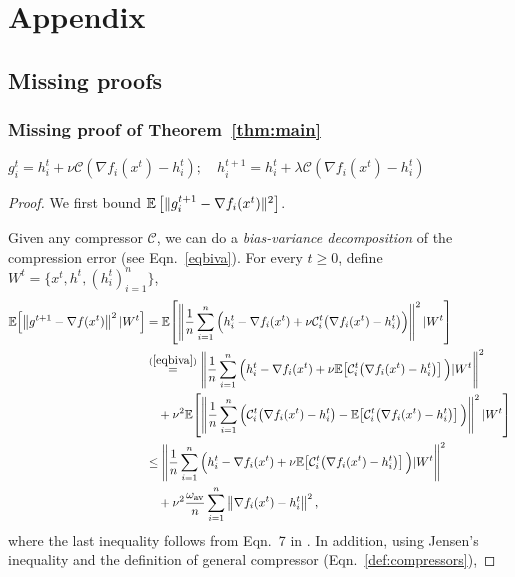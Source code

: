 \documentclass{article} %
\theoremstyle{plain}
\theoremstyle{definition}
\theoremstyle{remark}
\newcommand{\C}{\mathcal{C}}
\newcommand{\sqnorm}[1]{\left\| #1 \right\|^2}
\newcommand{\Exp}[1]{\mathbb{E}\!\left[ #1 \right]}
\newcommand{\oma}{\omega_{\mathrm{av}}}
\begin{document}
\section{Appendix}
\subsection{Missing proofs}
\subsubsection{Missing proof of Theorem~\ref{thm:main}}
$g_i^t = h_i^t + \nu \C(\nabla f_i (x^t) - h_i^t); \quad h_i^{t+1} = h_i^t + \lambda \C(\nabla f_i (x^t) - h_i^t)$

\begin{proof}
   We first bound $\mathbb{E}\left[\|g_i^{t+1} - \nabla f_i(x^{t})\|^2\right]$. 

   Given any compressor $\mathcal{C}$, we can do a {\it bias-variance decomposition} of the compression error (see Eqn.~\ref{eqbiva}). 
   For every $t\geq 0$, define $W^t = \{x^t, h^t, (h_i^t)_{i=1}^n\}$,
   \begin{equation}\label{eq0001}
   \begin{aligned}
      \Exp{\sqnorm{g^{t+1}-\nabla f(x^t)} | W^t} &=\Exp{\sqnorm{\frac{1}{n}\sum_{i=1}^n \Big(h_i^{t}-\nabla f_i(x^t) +\nu \mathcal{C}_i^t\big(\nabla f_i(x^t)-h_i^t\big) \Big) } | W^t}\\
      &\stackrel{(\ref{eqbiva})}{=}\sqnorm{\frac{1}{n}\sum_{i=1}^n \Big(h_i^{t}-\nabla f_i(x^t) +\nu \Exp{\mathcal{C}_i^t\big(\nabla f_i(x^t)-h_i^t\big)} \Big) | W^t} \\
      &\quad+\nu^2\Exp{\sqnorm{\frac{1}{n}\sum_{i=1}^n \Big( \mathcal{C}_i^t\big(\nabla f_i(x^t)-h_i^t\big)-\Exp{ \mathcal{C}_i^t\big(\nabla f_i(x^t)-h_i^t\big) } \Big) } | W^t}\\
      &\leq \sqnorm{\frac{1}{n}\sum_{i=1}^n \Big(h_i^{t}-\nabla f_i(x^t) +\nu \Exp{\mathcal{C}_i^t\big(\nabla f_i(x^t)-h_i^t\big)} \Big) | W^t}\\
      &\quad+\nu^2 \frac{\oma}{n}\sum_{i=1}^n \sqnorm{\nabla f_i(x^t)-h_i^t },
   \end{aligned}      
   \end{equation}
   where the last inequality follows from Eqn.~7 in \cite{condat2022ef}. In addition, using Jensen's inequality and the definition of general compressor (Eqn.~\ref{def:compressors}), 
 

\end{proof}
\end{document}
